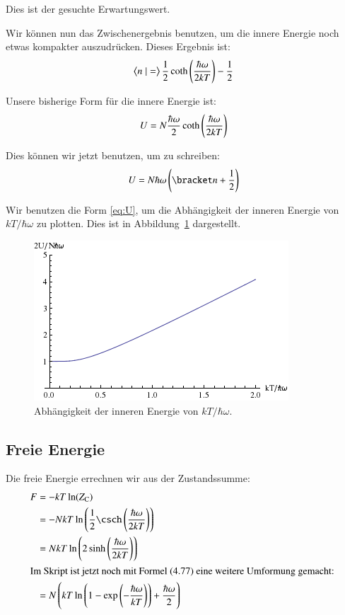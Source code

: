 Dies ist der gesuchte Erwartungswert.

Wir können nun das Zwischenergebnis benutzen, um die innere Energie noch etwas kompakter auszudrücken. Dieses Ergebnis ist:
\[
    \braket n = \frac12 \coth\del{\frac{\hbar\omega}{2kT}} - \frac 12
\]

Unsere bisherige Form für die innere Energie ist:
\begin{equation}
    \label{eq:U}
    U = N \frac{\hbar\omega}2 \coth\del{\frac{\hbar\omega}{2kT}}
\end{equation}

Dies können wir jetzt benutzen, um zu schreiben:
\[
    U = N \hbar \omega \del{\bracket n + \frac12}
\]

Wir benutzen die Form \eqref{eq:U}, um die Abhängigkeit der inneren Energie von $kT/\hbar\omega$ zu plotten. Dies ist in Abbildung~\ref{fig:U} dargestellt.

\begin{figure}[htbp]
    \centering
    \includegraphics[width=.6\linewidth]{2b.png}
    \caption{%
        Abhängigkeit der inneren Energie von $kT/\hbar\omega$.
    }
    \label{fig:U}
\end{figure}

\subsection{Freie Energie}

Die freie Energie errechnen wir aus der Zustandssumme:
\begin{align*}
    F
    &= - k T \ln(\ZC) \\
    &= - N k T \ln\del{\frac 12 \csch\del{\frac{\hbar\omega}{2kT}}} \\
    &= N k T \ln\del{2 \sinh\del{\frac{\hbar\omega}{2kT}}} \\
    \intertext{%
        Im Skript ist jetzt noch mit Formel (4.77) eine weitere Umformung
        gemacht:
    }
    &= N \del{kT \ln\del{1 - \exp\del{-\frac{\hbar\omega}{kT}}} + \frac{\hbar\omega}2}
\end{align*}

